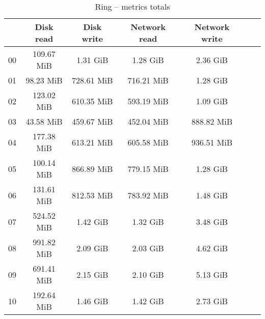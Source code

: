 \begin{table}[H]
\begin{center}
\caption{Ring -- metrics totals}
\label{tab:ring-total}
\begin{tabular}{|c|c|c|c|c|c|c|}
\hline
   & Disk read & Disk write & Network read & Network write\\
\hline
00 & 109.67 MiB & 1.31 GiB & 1.28 GiB & 2.36 GiB\\
01 & 98.23 MiB & 728.61 MiB & 716.21 MiB & 1.28 GiB\\
02 & 123.02 MiB & 610.35 MiB & 593.19 MiB & 1.09 GiB\\
03 & 43.58 MiB & 459.67 MiB & 452.04 MiB & 888.82 MiB\\
04 & 177.38 MiB & 613.21 MiB & 605.58 MiB & 936.51 MiB\\
05 & 100.14 MiB & 866.89 MiB & 779.15 MiB & 1.28 GiB\\
06 & 131.61 MiB & 812.53 MiB & 783.92 MiB & 1.48 GiB\\
07 & 524.52 MiB & 1.42 GiB & 1.32 GiB & 3.48 GiB\\
08 & 991.82 MiB & 2.09 GiB & 2.03 GiB & 4.62 GiB\\
09 & 691.41 MiB & 2.15 GiB & 2.10 GiB & 5.13 GiB\\
10 & 192.64 MiB & 1.46 GiB & 1.42 GiB & 2.73 GiB\\
\hline
\end{tabular}
\end{center}
\end{table}

